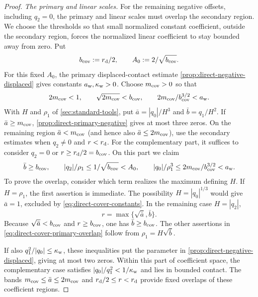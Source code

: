 \begin{proof}
\emph{The primary and linear scales.}
For the remaining negative offsets, including \(q_2=0\), the primary
and linear scales must overlap the secondary region. We choose the
thresholds so that small normalized constant coefficient, outside the
secondary region, forces the normalized linear coefficient to stay
bounded away from zero. Put
\[
 b_{\rm cov}:=r_{\rm d}/2,\qquad A_0:=2/\sqrt{b_{\rm cov}}.
\]
For this fixed \(A_0\), the primary displaced-contact
estimate \cref{prop:direct-negative-displaced} gives
constants \(a_{\rm w},\kappa_{\rm w}>0\).
Choose \(m_{\rm cov}>0\) so that
\begin{equation}
\label{eq:direct-cover-constants}
 2m_{\rm cov}<1,\qquad \sqrt{2m_{\rm cov}}<b_{\rm cov},
             \qquad 2m_{\rm cov}/b_{\rm cov}^{3/2}<a_{\rm w}.
\end{equation}
With \(H\) and \(\rho_1\) of \cref{sec:standard-tools}, put
\(\bar a=|q_0|/H^3\) and \(\bar b=q_1/H^2\).
If \(\bar a\ge m_{\rm cov}\),
\cref{prop:direct-primary-negative} gives at most three zeros.
On the remaining region \(\bar a<m_{\rm cov}\) (and hence also
\(\bar a\le2m_{\rm cov}\)), use the secondary estimates when
\(q_2\ne0\) and \(r<r_{\rm d}\). For the complementary part,
it suffices to consider \(q_2=0\) or
\(r\ge r_{\rm d}/2=b_{\rm cov}\). On this part we claim
\begin{equation}
\label{eq:direct-cover-primary-overlap}
 \bar b\ge b_{\rm cov},\qquad
 |q_2|/\rho_1\le1/\sqrt{b_{\rm cov}}<A_0,\qquad
 |q_0|/\rho_1^3\le2m_{\rm cov}/b_{\rm cov}^{3/2}<a_{\rm w}.
\end{equation}
To prove the overlap, consider which term realizes the maximum
defining \(H\). If \(H=\rho_1\), the first assertion is immediate.
The possibility \(H=|q_0|^{1/3}\) would give
\(\bar a=1\), excluded by \eqref{eq:direct-cover-constants}.
In the remaining case \(H=|q_2|\),
\[
 r=\max\{\sqrt{\bar a},\bar b\}.
\]
Because \(\sqrt{\bar a}<b_{\rm cov}\) and \(r\ge b_{\rm cov}\),
one has \(\bar b\ge b_{\rm cov}\).
The other assertions in
\eqref{eq:direct-cover-primary-overlap} follow from
\(\rho_1=H\sqrt{\bar b}\).

If also \(q_1^2/|q_0|\le\kappa_{\rm w}\), these inequalities put
the parameter in \cref{prop:direct-negative-displaced}, giving at
most two zeros. Within this part of coefficient space, the
complementary case satisfies \(|q_0|/q_1^2<1/\kappa_{\rm w}\)
and lies in bounded contact. The bands
\(m_{\rm cov}\le\bar a\le2m_{\rm cov}\) and
\(r_{\rm d}/2\le r<r_{\rm d}\) provide fixed overlaps of these
coefficient regions.


\end{proof}

